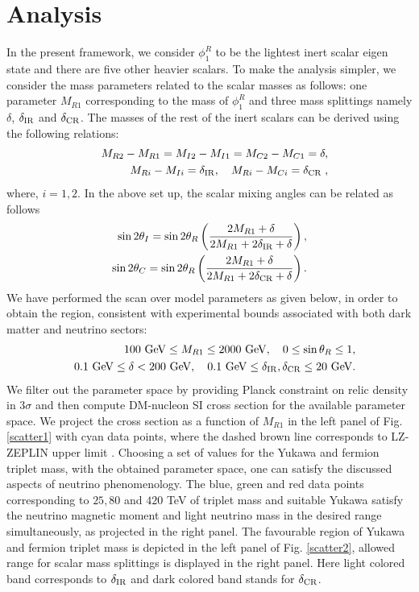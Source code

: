 \documentclass[aps, a4paper,superscriptaddress,12pt,preprintnumbers,floatfix,nofootinbib,amsmath,amssymb]{revtex4}
\newcommand{\nn}{\nonumber}
\begin{document}
\section{Analysis}
In the present framework, we consider $\phi^R_1$ to be the lightest inert scalar eigen state and there are five other heavier scalars. To make the analysis simpler, we consider the mass parameters related to the scalar masses as follows:  one parameter $M_{R1}$ corresponding to the mass of $\phi^R_1$ and three mass splittings namely $\delta$, $\delta_{\rm IR}$ and $\delta_{\rm CR}$. The masses of the rest of the inert scalars can be derived using the following relations:
\begin{eqnarray}
&& M_{R2} - M_{R1} = M_{I2} - M_{I1} = M_{C2} - M_{C1} = \delta, \nn\\
&& M_{Ri} - M_{Ii} = \delta_{\rm IR}, \quad M_{Ri} - M_{Ci} = \delta_{\rm CR}\;,
\end{eqnarray}
where, $i = 1,2$. In the above set up, the scalar mixing angles can be related as follows
\begin{eqnarray}
    \sin2\theta_I = \sin2\theta_R \left(\frac{2 M_{R1} + \delta}{2 M_{R1}+2\delta_{\rm IR} +\delta}\right),\\
    \sin2\theta_C = \sin2\theta_R \left(\frac{2 M_{R1} + \delta}{2 M_{R1}+2\delta_{\rm CR} +\delta}\right).
\end{eqnarray}
We have performed the scan over model parameters as given below, in order to obtain the region, consistent with experimental bounds associated with both dark matter and neutrino sectors: 
\begin{eqnarray}
&&100 ~{\rm GeV} \le M_{R1} \le 2000 ~{\rm GeV}, \quad 0 \le \sin\theta_R \le 1, \nn\\
&&0.1 ~{\rm GeV} \le \delta < 200 ~{\rm GeV}, \quad 0.1 ~{\rm GeV} \le \delta_{\rm IR}, \delta_{\rm CR} \le 20 ~{\rm GeV}.
\end{eqnarray}
We filter out the parameter space by providing Planck constraint on relic density \cite{Aghanim:2018eyx} in $3\sigma$ and then compute DM-nucleon SI cross section for the available parameter space. We project the cross section as a function of $M_{R1}$ in the left panel of Fig. \ref{scatter1} with cyan data points,  where the dashed brown line corresponds to LZ-ZEPLIN upper limit \cite{LZ:2022ufs}. Choosing a set of values for the Yukawa and fermion triplet mass, with the obtained parameter space, one can satisfy the discussed aspects of neutrino phenomenology. The blue, green and red data points corresponding to $25, 80$ and $420$ TeV of triplet mass and suitable Yukawa satisfy the neutrino magnetic moment and light neutrino mass in the desired range simultaneously, as projected in the right panel. The favourable region of Yukawa and fermion triplet mass is depicted in the left panel of Fig. \ref{scatter2}, allowed range for scalar mass splittings is displayed in the right panel. Here light colored band corresponds to $\delta_{\rm IR}$ and dark colored band stands for $\delta_{\rm CR}$.
\end{document}
